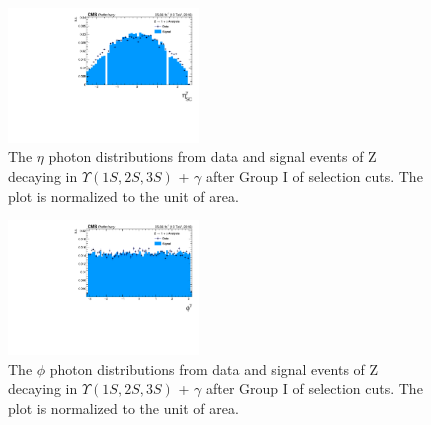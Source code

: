 \begin{figure}[!htbp]
\begin{center}
\includegraphics[width=0.45\textwidth]{figures/outputPlots/ZtoUpsilon_Cat0_ZZZZZ/au/data_x_mc/noKinCuts/h_noKin_Photon_eta}\hspace*{1.cm}
\end{center}\vspace*{-.5cm}
\caption{The $\eta$ photon distributions from data and signal events of Z decaying in $\Upsilon(1S,2S,3S)$ + $\gamma$ after Group I of selection cuts. The plot is normalized to the unit of area.}
\label{fig:etaPhoton_ZtoUpsilon_Cat0}
\end{figure}

\begin{figure}[!htbp]
\begin{center}
\includegraphics[width=0.45\textwidth]{figures/outputPlots/ZtoUpsilon_Cat0_ZZZZZ/au/data_x_mc/noKinCuts/h_noKin_Photon_phi}\hspace*{1.cm}
\end{center}\vspace*{-.5cm}
\caption{The $\phi$ photon distributions from data and signal events of Z decaying in $\Upsilon(1S,2S,3S)$ + $\gamma$ after Group I of selection cuts. The plot is normalized to the unit of area.}
\label{fig:phiPhoton_ZtoUpsilon_Cat0}
\end{figure}

